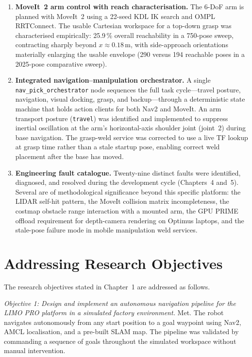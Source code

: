 \begin{enumerate}
    \item \textbf{MoveIt~2 arm control with reach characterisation.} The 6-DoF arm is
    planned with MoveIt~2 using a 22-seed KDL IK search and OMPL RRTConnect. The usable
    Cartesian workspace for a top-down grasp was characterised empirically: 25.9\,\%
    overall reachability in a 750-pose sweep, contracting sharply beyond
    $x\approx0.18$\,m, with side-approach orientations materially enlarging the usable
    envelope (290 versus 194 reachable poses in a 2025-pose comparative sweep).

    \item \textbf{Integrated navigation--manipulation orchestrator.} A single
    \texttt{nav\_pick\_orchestrator} node sequences the full task cycle---travel posture,
    navigation, visual docking, grasp, and backup---through a deterministic state machine
    that holds action clients for both Nav2 and MoveIt. An arm transport posture
    (\texttt{travel}) was identified and implemented to suppress inertial oscillation at
    the arm's horizontal-axis shoulder joint (joint~2) during base navigation. The
    grasp-weld service was corrected to use a live TF lookup at grasp time rather than a
    stale startup pose, enabling correct weld placement after the base has moved.

    \item \textbf{Engineering fault catalogue.} Twenty-nine distinct faults were
    identified, diagnosed, and resolved during the development cycle (Chapters~4 and~5).
    Several are of methodological significance beyond this specific platform: the LIDAR
    self-hit pattern, the MoveIt collision matrix incompleteness, the costmap obstacle
    range interaction with a mounted arm, the GPU PRIME offload requirement for
    depth-camera rendering on Optimus laptops, and the stale-pose failure mode in mobile
    manipulation weld services.
\end{enumerate}

\section{Addressing Research Objectives}
The research objectives stated in Chapter~1 are addressed as follows.

\textit{Objective 1: Design and implement an autonomous navigation pipeline for the
LIMO PRO platform in a simulated factory environment.}
Met. The robot navigates autonomously from any start position to a goal waypoint using
Nav2, AMCL localisation, and a pre-built SLAM map. The pipeline was validated by
commanding a sequence of goals throughout the simulated workspace without manual
intervention.

